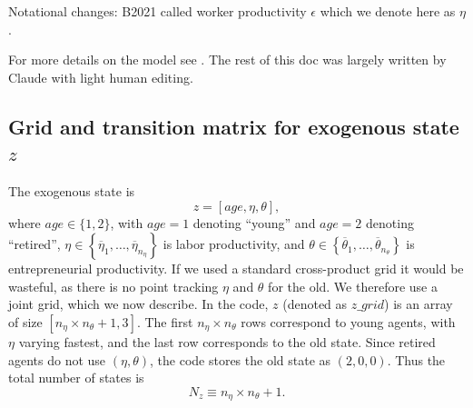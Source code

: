 \documentclass[11pt,fleqn]{article}
\begin{document}
Notational changes: B2021 called worker productivity $\epsilon$ which we denote here as $\eta$.

For more details on the model see \cite*{Bruggemann2021}. The rest of this doc was largely written by Claude with light human editing.


\subsection{Grid and transition matrix for exogenous state \texorpdfstring{$z$}{z}\label{sec:z_grid_transition}}

The exogenous state is
\begin{equation*}
	z=[age,\eta,\theta],
\end{equation*}%
where $age\in \{1,2\}$, with $age=1$ denoting ``young'' and $age=2$ denoting ``retired'', $\eta \in \left\{
\overline{\eta }_{1},\ldots ,\overline{\eta }_{n_{\eta
}}\right\}$ is labor productivity, and $\theta \in \left\{
\overline{\theta }_{1},\ldots ,\overline{\theta }_{n_{\theta }}\right\}$ is entrepreneurial productivity. If we used a standard cross-product grid it would be wasteful, as there is no point tracking $\eta$ and $\theta$ for the old. We therefore use a joint grid, which we now describe. In the code, $z$ (denoted as $z\_grid$) is an array of size $[n_{\eta }\times n_{\theta }+1,3]$. The first $n_{\eta }\times n_{\theta}$ rows correspond to young agents, with $\eta$ varying fastest, and the last row corresponds to the old state. Since retired agents do not use $(\eta,\theta)$, the code stores the old state as $(2,0,0)$. Thus the total number of states is
\begin{equation*}
	N_{z}\equiv n_{\eta }\times n_{\theta }+1.
\end{equation*}%
\end{document}

